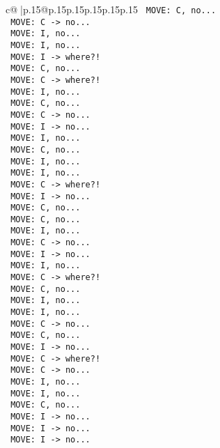 \documentclass{article}
\begin{document}
{\begin{supertabular}{c@{$\;$}|p{.15\linewidth}@{}p{.15\linewidth}p{.15\linewidth}p{.15\linewidth}p{.15\linewidth}p{.15\linewidth}}
{{{\texttt{ MOVE: C, no...} \\
\texttt{ MOVE: C {-}> no...} \\
\texttt{ MOVE: I, no...} \\
\texttt{ MOVE: I, no...} \\
\texttt{ MOVE: I {-}> where?!} \\
\texttt{ MOVE: C, no...} \\
\texttt{ MOVE: C {-}> where?!} \\
\texttt{ MOVE: I, no...} \\
\texttt{ MOVE: C, no...} \\
\texttt{ MOVE: C {-}> no...} \\
\texttt{ MOVE: I {-}> no...} \\
\texttt{ MOVE: I, no...} \\
\texttt{ MOVE: C, no...} \\
\texttt{ MOVE: I, no...} \\
\texttt{ MOVE: I, no...} \\
\texttt{ MOVE: C {-}> where?!} \\
\texttt{ MOVE: I {-}> no...} \\
\texttt{ MOVE: C, no...} \\
\texttt{ MOVE: C, no...} \\
\texttt{ MOVE: I, no...} \\
\texttt{ MOVE: C {-}> no...} \\
\texttt{ MOVE: I {-}> no...} \\
\texttt{ MOVE: I, no...} \\
\texttt{ MOVE: C {-}> where?!} \\
\texttt{ MOVE: C, no...} \\
\texttt{ MOVE: I, no...} \\
\texttt{ MOVE: I, no...} \\
\texttt{ MOVE: C {-}> no...} \\
\texttt{ MOVE: C, no...} \\
\texttt{ MOVE: I {-}> no...} \\
\texttt{ MOVE: C {-}> where?!} \\
\texttt{ MOVE: C {-}> no...} \\
\texttt{ MOVE: I, no...} \\
\texttt{ MOVE: I, no...} \\
\texttt{ MOVE: C, no...} \\
\texttt{ MOVE: I {-}> no...} \\
\texttt{ MOVE: I {-}> no...} \\
\texttt{ MOVE: I {-}> no...} \\
}}}
\end{supertabular}}
\end{document}
